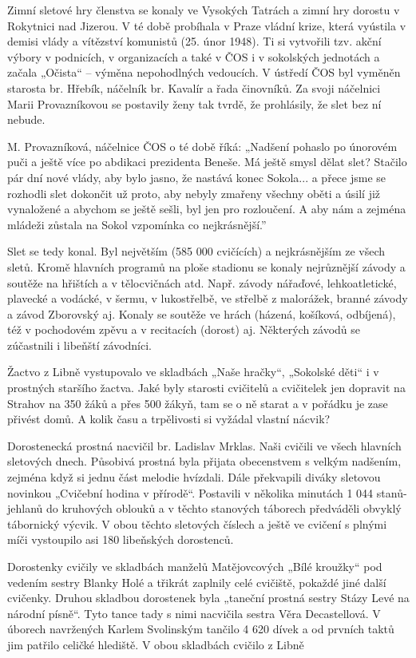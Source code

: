 Zimní sletové hry členstva se konaly ve Vysokých Tatrách a zimní hry
dorostu v Rokytnici nad Jizerou. V té době probíhala v Praze vládní
krize, která vyústila v demisi vlády a vítězství komunistů (25. únor
1948). Ti si vytvořili tzv. akční výbory v podnicích, v organizacích a
také v ČOS i v sokolských jednotách a začala „Očista`` -- výměna
nepohodlných vedoucích. V ústředí ČOS byl vyměněn starosta br. Hřebík,
náčelník br. Kavalír a řada činovníků. Za svoji náčelnici Marii
Provazníkovou se postavily ženy tak tvrdě, že prohlásily, že slet bez ní
nebude.

M. Provazníková, náčelnice ČOS o té době říká: „Nadšení pohaslo po
únorovém puči a ještě více po abdikaci prezidenta Beneše. Má ještě smysl
dělat slet? Stačilo pár dní nové vlády, aby bylo jasno, že nastává konec
Sokola... a přece jsme se rozhodli slet dokončit už proto, aby nebyly
zmařeny všechny oběti a úsilí již vynaložené a abychom se ještě sešli,
byl jen pro rozloučení. A aby nám a zejména mládeži zůstala na Sokol
vzpomínka co nejkrásnější.''

Slet se tedy konal. Byl největším (585 000 cvičících) a nejkrásnějším ze
všech sletů. Kromě hlavních programů na ploše stadionu se konaly
nejrůznější závody a soutěže na hřištích a v tělocvičnách atd. Např.
závody nářaďové, lehkoatletické, plavecké a vodácké, v šermu, v
lukostřelbě, ve střelbě z malorážek, branné závody a závod Zborovský aj.
Konaly se soutěže ve hrách (házená, košíková, odbíjená), též v
pochodovém zpěvu a v recitacích (dorost) aj. Některých závodů se
zúčastnili i libeňští závodníci.

Žactvo z Libně vystupovalo ve skladbách „Naše hračky``, „Sokolské děti``
i v prostných staršího žactva. Jaké byly starosti cvičitelů a cvičitelek
jen dopravit na Strahov na 350 žáků a přes 500 žákyň, tam se o ně starat
a v pořádku je zase přivést domů. A kolik času a trpělivosti si vyžádal
vlastní nácvik?

Dorostenecká prostná nacvičil br. Ladislav Mrklas. Naši cvičili ve všech
hlavních sletových dnech. Působivá prostná byla přijata obecenstvem s
velkým nadšením, zejména když si jednu část melodie hvízdali. Dále
překvapili diváky sletovou novinkou „Cvičební hodina v přírodě``.
Postavili v několika minutách 1 044 stanů-jehlanů do kruhových oblouků a
v těchto stanových táborech předváděli obvyklý tábornický výcvik. V obou
těchto sletových číslech a ještě ve cvičení s plnými míči vystoupilo asi
180 libeňských dorostenců.

Dorostenky cvičily ve skladbách manželů Matějovcových „Bílé kroužky``
pod vedením sestry Blanky Holé a třikrát zaplnily celé cvičiště, pokaždé
jiné další cvičenky. Druhou skladbou dorostenek byla „taneční prostná
sestry Stázy Levé na národní písně``. Tyto tance tady s nimi nacvičila
sestra Věra Decastellová. V úborech navržených Karlem Svolinským tančilo
4 620 dívek a od prvních taktů jim patřilo celičké hlediště. V obou
skladbách cvičilo z Libně

